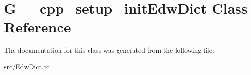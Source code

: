 \hypertarget{class_g____cpp__setup__init_edw_dict}{
\section{G\_\-\_\-cpp\_\-setup\_\-initEdwDict Class Reference}
\label{class_g____cpp__setup__init_edw_dict}
}


The documentation for this class was generated from the following file:\begin{DoxyCompactItemize}
\item 
src/EdwDict.cc\end{DoxyCompactItemize}
